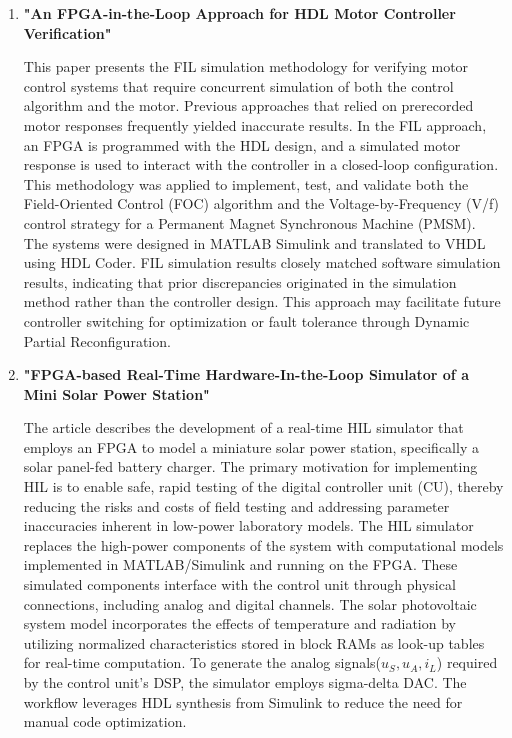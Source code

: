 \begin{enumerate}
	\item \textbf{"An \acs{FPGA}-in-the-Loop Approach for HDL Motor Controller Verification"} \cite{HDL_motorController_LiteratureSurvey}
	
	This paper presents the \acs{FIL} simulation methodology for verifying motor control systems that require concurrent simulation of both the control algorithm and the motor. Previous approaches that relied on prerecorded motor responses frequently yielded inaccurate results. In the \acs{FIL} approach, an \acs{FPGA} is programmed with the HDL design, and a simulated motor response is used to interact with the controller in a closed-loop configuration. This methodology was applied to implement, test, and validate both the Field-Oriented Control (FOC) algorithm and the Voltage-by-Frequency (V/f) control strategy for a Permanent Magnet Synchronous Machine (PMSM). The systems were designed in MATLAB Simulink and translated to VHDL using HDL Coder. \acs{FIL} simulation results closely matched software simulation results, indicating that prior discrepancies originated in the simulation method rather than the controller design. This approach may facilitate future controller switching for optimization or fault tolerance through Dynamic Partial Reconfiguration.
	
	\item \textbf{"\acs{FPGA}-based Real-Time Hardware-In-the-Loop Simulator of a Mini Solar Power Station"} \cite{Debreceni2014_MiniSolarHIL_LiteratureSurvey}
	
	The article describes the development of a real-time \acs{HIL} simulator that employs an \acs{FPGA} to model a miniature solar power station, specifically a solar panel-fed battery charger. The primary motivation for implementing \acs{HIL} is to enable safe, rapid testing of the digital controller unit (CU), thereby reducing the risks and costs of field testing and addressing parameter inaccuracies inherent in low-power laboratory models. The \acs{HIL} simulator replaces the high-power components of the system with computational models implemented in MATLAB/Simulink and running on the \acs{FPGA}. These simulated components interface with the control unit through physical connections, including analog and digital channels. The solar photovoltaic system model incorporates the effects of temperature and radiation by utilizing normalized characteristics stored in block RAMs as look-up tables for real-time computation. To generate the analog signals($\textit{u}_S, \textit{u}_A, \textit{i}_L$) required by the control unit's DSP, the simulator employs sigma-delta \acs{DAC}. The workflow leverages HDL synthesis from Simulink to reduce the need for manual code optimization.
	

\end{enumerate}
